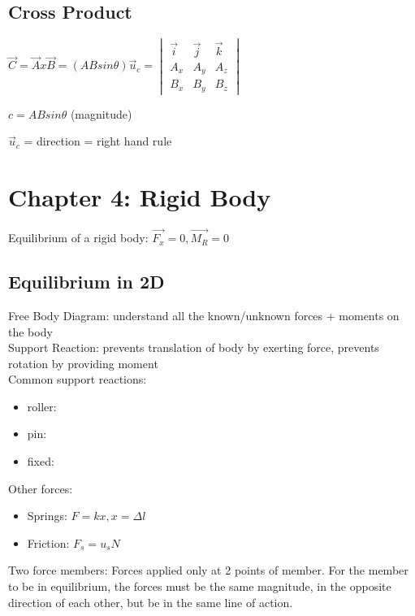 \documentclass{article}
\begin{document}
    \subsection{Cross Product}
    $\vec{C}=\vec{A}x\vec{B}=(ABsin\theta)\vec{u}_c= 
        \begin{vmatrix}
            \vec{i} & \vec{j} & \vec{k} \\ A_x & A_y & A_z \\ B_x & B_y & B_z
        \end{vmatrix}$

    $c=ABsin\theta$ (magnitude)
    
    $\vec{u}_c$ = direction = right hand rule 

    

    \section{Chapter 4: Rigid Body}
    Equilibrium of a rigid body: $\vec{F_x}=0, \vec{M_R}=0$

    \subsection{Equilibrium in 2D}
    Free Body Diagram: understand all the known/unknown forces + moments on the body \\
    Support Reaction: prevents translation of body by exerting force, prevents rotation by providing moment\\
    Common support reactions:
    \begin{itemize}
        \item roller:
        \item pin:
        \item fixed:
    \end{itemize}
    Other forces:
    \begin{itemize}
        \item Springs: $F=kx, x=\Delta l$ 
        \item Friction: $F_s=u_sN$
    \end{itemize}
    Two force members: Forces applied only at 2 points of member. For the member to be in equilibrium, the forces must be the same magnitude, 
    in the opposite direction of each other, but be in the same line of action.
\end{document}
